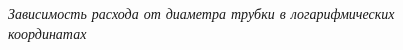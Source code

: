 \documentclass[a4paper, fontsize = 14pt]{article}
\begin{document}
\begin{figure}[hbt]
\caption{\textit{Зависимость расхода от диаметра трубки в логарифмических координатах}}
\end{figure}
\end{document}
